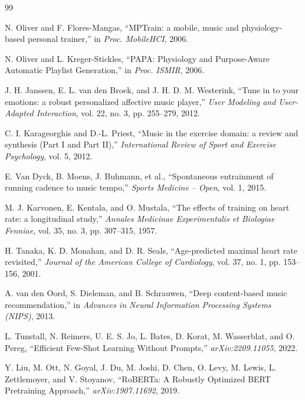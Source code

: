 \documentclass[11pt,a4paper]{article}
\begin{document}
	\begin{thebibliography}{99}

		N. Oliver and F. Flores-Mangas,
		``MPTrain: a mobile, music and physiology-based personal trainer,''
		in \textit{Proc. MobileHCI}, 2006.

		N. Oliver and L. Kreger-Stickles,
		``PAPA: Physiology and Purpose-Aware Automatic Playlist Generation,''
		in \textit{Proc. ISMIR}, 2006.

		J. H. Janssen, E. L. van den Broek, and J. H. D. M. Westerink,
		``Tune in to your emotions: a robust personalized affective music player,''
		\textit{User Modeling and User-Adapted Interaction}, vol. 22, no. 3, pp. 255--279, 2012.

		C. I. Karageorghis and D.-L. Priest,
		``Music in the exercise domain: a review and synthesis (Part I and Part II),''
		\textit{International Review of Sport and Exercise Psychology}, vol. 5, 2012.

		E. Van Dyck, B. Moens, J. Buhmann, et al.,
		``Spontaneous entrainment of running cadence to music tempo,''
		\textit{Sports Medicine -- Open}, vol. 1, 2015.

		M. J. Karvonen, E. Kentala, and O. Mustala,
		``The effects of training on heart rate: a longitudinal study,''
		\textit{Annales Medicinae Experimentalis et Biologiae Fenniae}, vol. 35, no. 3, pp. 307--315, 1957.

		H. Tanaka, K. D. Monahan, and D. R. Seals,
		``Age-predicted maximal heart rate revisited,''
		\textit{Journal of the American College of Cardiology}, vol. 37, no. 1, pp. 153--156, 2001.

		A. van den Oord, S. Dieleman, and B. Schrauwen,
		``Deep content-based music recommendation,''
		in \textit{Advances in Neural Information Processing Systems (NIPS)}, 2013.

		L. Tunstall, N. Reimers, U. E. S. Jo, L. Bates, D. Korat, M. Wasserblat, and O. Pereg,
		``Efficient Few-Shot Learning Without Prompts,''
		\textit{arXiv:2209.11055}, 2022.

		Y. Liu, M. Ott, N. Goyal, J. Du, M. Joshi, D. Chen, O. Levy, M. Lewis, L. Zettlemoyer, and V. Stoyanov,
		``RoBERTa: A Robustly Optimized BERT Pretraining Approach,''
		\textit{arXiv:1907.11692}, 2019.


\end{thebibliography}
\end{document}
